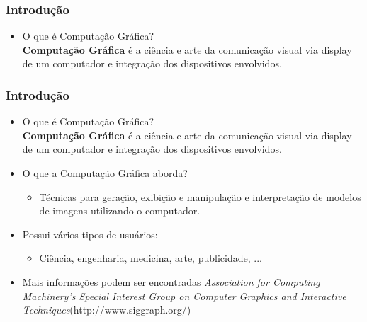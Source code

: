 \documentclass{beamer}
\begin{document}
\begin{frame}
\frametitle{Introdução}

\begin{itemize}
	\item O que é Computação Gráfica? \\
	\textbf{Computação Gráfica} é a ciência e arte da comunicação visual via display de um computador e integração dos dispositivos envolvidos.
	

\end{itemize}
\end{frame}


\begin{frame}
\frametitle{Introdução}

\begin{block}


\begin{itemize}
	
	\item<1-> O que é Computação Gráfica?\\
		\textbf{Computação Gráfica} é a ciência e arte da comunicação visual via display de um computador e integração dos dispositivos envolvidos.
	\item<2-> O que a Computação Gráfica aborda?\\
		\begin{itemize}
			\item<3-> Técnicas para geração, exibição e manipulação e interpretação de modelos de imagens utilizando o computador.
		\end{itemize}
	\item<3-> Possui vários tipos de usuários:
		\begin{itemize}
			\item Ciência, engenharia, medicina, arte, publicidade, ...
		\end{itemize}
	\item<4-> Mais informações podem ser encontradas \textit{Association for Computing Machinery’s Special Interest Group on Computer Graphics and Interactive Techniques}(http://www.siggraph.org/)

\end{itemize}
\end{block}
\end{frame}



\end{document}
